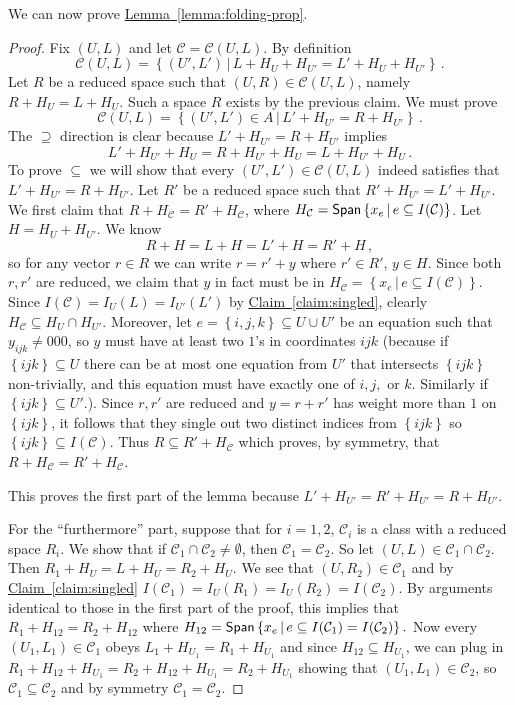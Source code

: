\documentclass[11pt]{article}
\numberwithin{equation}{section}
\theoremstyle{definition}
\theoremstyle{plain}
\newcommand{\C}{\mathbb C}
\newcommand{\expref}[2]{\hyperref[#2]{#1~\ref{#2}}}
\newcommand\set[1]{{\left\{ #1 \right\}}}
\newcommand\Set[2]{ \left\{ #1 \,  \vert  \, #2\right\} }
\newcommand\spn{{\sf Span}}
\renewcommand\subset{\subseteq}
\def\C{\mathcal{C}}
\begin{document}
We can now prove \expref{Lemma}{lemma:folding-prop}.
\begin{proof}
Fix $(U,L)$ and let $\C=\C(U,L)$. By definition
\[
\C(U,L) = \Set{(U',L') }{ L+H_U+H_{U'} =
  L' + H_U + H_{U'}}\,.
\]
Let $R$ be a reduced space such that $(U,R)\in
\C(U,L)$, namely  $R+H_{U} = L+H_{U}$. Such a space $R$ exists by the previous claim. We must prove
\[ \C(U,L) = \Set{ (U',L')\in A }{ L'+H_{U'}= R+H_{U'}}\,.
\]
The $\supseteq$ direction is clear because $L'+H_{U'}= R+H_{U'}$ implies
\[ L' + H_{U'} + H_U = R + H_{U'} + H_U = L + H_{U'} + H_U\,.\]
%
To prove $\subseteq$ we will show that every $(U',L')\in \C(U,L)$ indeed satisfies that $L' + H_{U'} = R + H_{U'}$. Let $R'$ be a reduced space such that $R'+H_{U'} = L'+H_{U'}$. We first claim that $R+H_\C=R'+H_\C $, where $H_\C =
\spn\Set{x_e}{e\subset I(\C)}$. Let $H = H_{U}+ H_{U'}$. We know
%
\[R + H = L + H = L' + H= R' + H\,, \]
%
so for any vector $r\in R$ we can write $r = r' + y$ where $r'\in R'$, $y\in H$. Since both $r,r'$ are reduced, we claim that $y$ in fact must be in $H_\C = \Set{x_e}{e\subset I(\C)}$. Since $I(\C)=I_U(L)=I_{U'}(L')$ by \expref{Claim}{claim:singled}, clearly $H_\C\subset H_{U}\cap H_{U'}$. Moreover, let $e=\set{i,j,k}\subset U\cup U'$ be an equation such that $y_{ijk}\neq 000$, so $y$ must have at least two $1$'s in coordinates $ijk$ (because if $\set {ijk} \subset U$ there can be at most one equation from $U'$ that intersects $\set{ijk}$ non-trivially, and this equation must have exactly one of $i,j,$ or $k$. Similarly if $\set {ijk}\subset U'$.). Since $r,r'$ are reduced and $y = r+r'$ has weight more than $1$ on $\set{ijk}$, it follows that they single out two distinct indices from $\set{ijk}$ so $\set{ijk}\subset I(\C)$. Thus $R\subset R'+H_\C$ which proves, by symmetry, that $R+H_\C = R'+H_\C$.

This proves the first part of the lemma because $L' + H_{U'} = R' + H_{U'} = R + H_{U'}$.

For the ``furthermore'' part, suppose that for $i=1,2$, $\C_i$ is a class with a reduced space $R_i$. We show that if $\C_1\cap\C_2 \neq \emptyset$, then $\C_1=\C_2$. So let $(U,L) \in \C_1\cap \C_2$. Then
$R_1+H_U = L+H_U = R_2 + H_U$.
%
We see that $(U,R_2)\in \C_1$ and by \expref{Claim}{claim:singled} $I(\C_1)=I_U(R_1)=I_U(R_2)= I(\C_2)$.
%
By arguments identical to those in the first part of the proof, this implies that $R_1+H_{12} = R_2+H_{12}$ where
$H_{12} = \spn\Set{x_e}{e\subset I(\C_1)=I(\C_2)}.$
Now every $(U_1,L_1)\in \C_1$ obeys $L_1+H_{U_1} = R_1+H_{U_1}$ and since $H_{12} \subset H_{U_1}$, we can plug in $R_1 + H_{12} + H_{U_1} = R_2 + H_{12} + H_{U_1} = R_2 + H_{U_1}$ showing that $(U_1,L_1)\in \C_2$, so $\C_1\subseteq\C_2$ and by symmetry $\C_1=\C_2$.
%
\end{proof}
\end{document}
